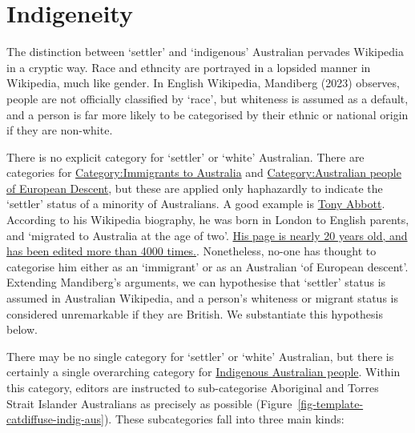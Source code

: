 \documentclass[
  a4paper,
  DIV=11,
  numbers=noendperiod]{scrreprt}
\begin{document}
\hypertarget{indigeneity}{%
\section{Indigeneity}\label{indigeneity}}

The distinction between `settler' and `indigenous' Australian pervades
Wikipedia in a cryptic way. Race and ethncity are portrayed in a
lopsided manner in Wikipedia, much like gender. In English Wikipedia,
Mandiberg (2023) observes, people are not officially classified by
`race', but whiteness is assumed as a default, and a person is far more
likely to be categorised by their ethnic or national origin if they are
non-white.

There is no explicit category for `settler' or `white' Australian. There
are categories for
\href{https://en.wikipedia.org/wiki/Category:Immigrants_to_Australia}{Category:Immigrants
to Australia} and
\href{https://en.wikipedia.org/wiki/Category:Australian_people_of_European_descent}{Category:Australian
people of European Descent}, but these are applied only haphazardly to
indicate the `settler' status of a minority of Australians. A good
example is
\href{https://en.wikipedia.org/w/index.php?title=Tony_Abbott\&oldid=1178396384}{Tony
Abbott}. According to his Wikipedia biography, he was born in London to
English parents, and `migrated to Australia at the age of two'.
\href{https://en.wikipedia.org/w/index.php?title=Tony_Abbott\&action=info}{His
page is nearly 20 years old, and has been edited more than 4000 times.}.
Nonetheless, no-one has thought to categorise him either as an
`immigrant' or as an Australian `of European descent'. Extending
Mandiberg's arguments, we can hypothesise that `settler' status is
assumed in Australian Wikipedia, and a person's whiteness or migrant
status is considered unremarkable if they are British. We substantiate
this hypothesis below.

There may be no single category for `settler' or `white' Australian, but
there is certainly a single overarching category for
\href{https://en.wikipedia.org/w/index.php?title=Category:Indigenous_Australian_people\&oldid=971541573}{Indigenous
Australian people}. Within this category, editors are instructed to
sub-categorise Aboriginal and Torres Strait Islander Australians as
precisely as possible (Figure~\ref{fig-template-catdiffuse-indig-aus}).
These subcategories fall into three main kinds:
\end{document}
